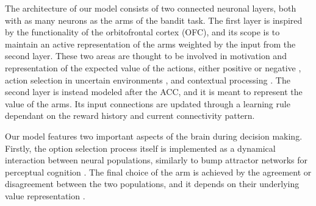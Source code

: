 The architecture of our model consists of two connected neuronal layers, both with as many neurons as the arms of the bandit task.
The first layer is inspired by the functionality of the orbitofrontal cortex (OFC), and its scope is to maintain an active representation of the arms weighted by the input from the second layer. These two areas are thought to be involved in motivation and representation of the expected value of the actions, either positive or negative \cite{odohertyAbstractRewardPunishment2001, ricebergRewardStabilityDetermines2012, tremblayRelativeRewardPreference1999}, action selection in uncertain environments \cite{elliottDissociableFunctionsMedial2000}, and contextual processing \cite{frankAnatomyDecisionStriatoorbitofrontal2006}.
The second layer is instead modeled after the ACC, and it is meant to represent the value of the arms. Its input connections are updated through a learning rule dependant on the reward history and current connectivity pattern.

Our model features two important aspects of the brain during decision making. Firstly, the option selection process itself is implemented as a dynamical interaction between neural populations, similarly to bump attractor networks for perceptual cognition \cite{carrollEncodingCertaintyBump2014, esnaola-acebesBumpAttractorDynamics2021}.
The final choice of the arm is achieved by the agreement or disagreement between the two populations, and it depends on their underlying value representation \cite{bariDynamicDecisionMaking2021, houstonMatchingBehavioursRewards2021}.

